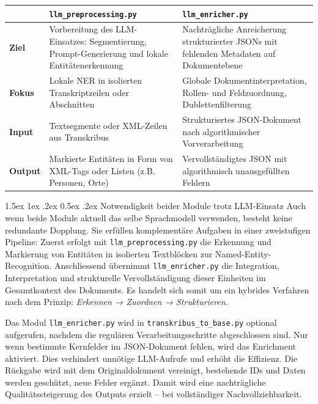 \documentclass[12pt, a4paper, ngerman, bidi=default]{article}
\makeatletter
\newcommand{\code}[1]{\colorbox{VeryLightGray}{\texttt{#1}}} %
\let\oldparagraph\paragraph%
\renewcommand{\paragraph}{
    \@ifstar%
      \xxxParagraphStar%
      \xxxParagraphNoStar%
 }
\newcommand{\xxxParagraphStar}[1]{\oldparagraph*{#1}\mbox{}}
\newcommand{\xxxParagraphNoStar}[1]{\oldparagraph{#1}\mbox{}}
\renewcommand\paragraph{\@startsection{paragraph}{4}{0em}%
  {1.5ex \@plus1ex \@minus.2ex}%
  {0.5ex \@plus.2ex}%
  {\normalfont\normalsize\bfseries\itshape}}
\makeatother
\begin{document}
\begin{center}
\begin{tabular}{p{1.5cm} p{6.2cm} p{6.2cm}}

\toprule
~ & \textbf{\code{llm\_preprocessing.py}} & \textbf{\code{llm\_enricher.py}} \\
\midrule
\textbf{Ziel} & 
Vorbereitung des LLM-Einsatzes: Segmentierung, Prompt-Generierung und lokale Entitätenerkennung &
Nachträgliche Anreicherung strukturierter JSONs mit fehlenden Metadaten auf Dokumentebene \\
\midrule
\textbf{Fokus} & 
Lokale NER in isolierten Transkriptzeilen oder Abschnitten &
Globale Dokumentinterpretation, Rollen- und Feldzuordnung, Dublettenfilterung \\
\midrule
\textbf{Input} & 
Textsegmente oder XML-Zeilen aus Transkribus &
Strukturiertes JSON-Dokument nach algorithmischer Vorverarbeitung \\
\midrule
\textbf{Output} & 
Markierte Entitäten in Form von XML-Tags oder Listen (z.B. Personen, Orte) &
Vervollständigtes JSON mit algorithmisch unausgefüllten Feldern\\
\bottomrule
\end{tabular}
\end{center}
\vspace{0.4cm}

\paragraph{Notwendigkeit beider Module trotz LLM-Einsatz}%
Auch wenn beide Module aktuell das selbe Sprachmodell verwenden, besteht keine redundante Dopplung. Sie erfüllen komplementäre Aufgaben in einer zweistufigen Pipeline: Zuerst erfolgt mit \code{llm\_preprocessing.py} die Erkennung und Markierung von Entitäten in isolierten Textblöcken zur Named-Entity-Recognition. Anschliessend übernimmt \code{llm\_enricher.py} die Integration, Interpretation und strukturelle Vervollständigung dieser Einheiten im Gesamtkontext des Dokuments. Es handelt sich somit um ein hybrides Verfahren nach dem Prinzip: \textit{Erkennen → Zuordnen → Strukturieren}.

Das Modul \code{llm\_enricher.py} wird in \code{transkribus\_to\_base.py} optional aufgerufen, nachdem die regulären Verarbeitungsschritte abgeschlossen sind. Nur wenn bestimmte Kernfelder im JSON-Dokument fehlen, wird das Enrichment aktiviert. Dies verhindert unnötige LLM-Aufrufe und erhöht die Effizienz. Die Rückgabe wird mit dem Originaldokument vereinigt, bestehende IDs und Daten werden geschützt, neue Felder ergänzt. Damit wird eine nachträgliche Qualitätssteigerung des Outputs erzielt – bei vollständiger Nachvollziehbarkeit.
\end{document}
